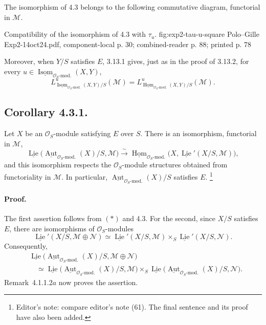 The isomorphism of 4.3 belongs to the following commutative diagram,
functorial in \(\mathcal M\).

  {Compatibility of the isomorphism of 4.3 with \(\tau_u\).}
  {fig:exp2-tau-u-square}
  {Polo--Gille Exp2-14oct24.pdf, component-local p. 30; combined-reader p. 88; printed p. 78}

Moreover, when \(Y/S\) satisfies \(E\), 3.13.1 gives, just as in the proof
of 3.13.2, for every
\(u\in\underline{\operatorname{Isom}}_{\mathcal O_S\text{-mod.}}(X,Y)\),
\begin{equation}
 L^u_{\underline{\operatorname{Isom}}_{\mathcal O_S\text{-mod.}}(X,Y)/S}
   (\mathcal M)
 =
 L^u_{\underline{\operatorname{Hom}}_{\mathcal O_S\text{-mod.}}(X,Y)/S}
   (\mathcal M).
 \tag{*}
\end{equation}

\subsection*{Corollary 4.3.1.}
Let \(X\) be an \(\mathcal O_S\)-module satisfying \(E\) over \(S\). There
is an isomorphism, functorial in \(\mathcal M\),
\[
 \underline{\operatorname{Lie}}
  \bigl(\underline{\operatorname{Aut}}_{\mathcal O_S\text{-mod.}}(X)/S,
        \mathcal M\bigr)
 \xrightarrow{\sim}
 \underline{\operatorname{Hom}}_{\mathcal O_S\text{-mod.}}
  \bigl(X,\underline{\operatorname{Lie}}'(X/S,\mathcal M)\bigr),
\]
and this isomorphism respects the \(\mathcal O_S\)-module structures
obtained from functoriality in \(\mathcal M\). In particular,
\(\underline{\operatorname{Aut}}_{\mathcal O_S\text{-mod.}}(X)/S\)
satisfies \(E\).
\footnote{Editor's note: compare editor's note (61). The final sentence
and its proof have also been added.}

\paragraph{Proof.}
The first assertion follows from \((*)\) and 4.3. For the second, since
\(X/S\) satisfies \(E\), there are isomorphisms of
\(\mathcal O_S\)-modules
\[
 \underline{\operatorname{Lie}}'(X/S,\mathcal M\oplus\mathcal N)
 \simeq
 \underline{\operatorname{Lie}}'(X/S,\mathcal M)
 \times_S
 \underline{\operatorname{Lie}}'(X/S,\mathcal N).
\]
Consequently,
\[
\begin{aligned}
 &\underline{\operatorname{Lie}}
  \bigl(\underline{\operatorname{Aut}}_{\mathcal O_S\text{-mod.}}(X)/S,
  \mathcal M\oplus\mathcal N\bigr)\\
 &\quad\simeq
 \underline{\operatorname{Lie}}
  \bigl(\underline{\operatorname{Aut}}_{\mathcal O_S\text{-mod.}}(X)/S,
  \mathcal M\bigr)
 \times_S
 \underline{\operatorname{Lie}}
  \bigl(\underline{\operatorname{Aut}}_{\mathcal O_S\text{-mod.}}(X)/S,
  \mathcal N\bigr).
\end{aligned}
\]
Remark~4.1.1.2\(a\) now proves the assertion.

